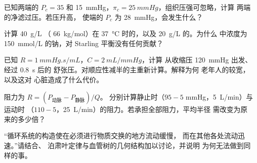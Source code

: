 \begin{exercise}[$\star\star$]\label{exo:b2:blood-circulation:8}
已知两端的 $P_c = 35$ 和 \qty{15}{mmHg}，$\pi_c =
\qty{25}{mmHg}$，组织压强可忽略，计算
两端的净滤过压。若压升高，
使端的 $P_c$ 为 \qty{28}{mmHg}，会发生什么？
\end{exercise}

\begin{exercise}[$\star\star$]\label{exo:b2:blood-circulation:9}
计算 \qty{40}{g/L} （
\qty{66}{kg/mol}）在 \qty{37}{\celsius} 时的，以及 \qty{20}{g/L} 的。为什么
中浓度为 \qty{150}{mmol/L} 的钠，对
Starling 平衡没有任何贡献？
\end{exercise}

\begin{exercise}[$\star\star\star$]\label{exo:b2:blood-circulation:10}
已知 $R = \qty{1}{mmHg.s/mL}$，$C = \qty{2}{mL/mmHg}$，计算
从收缩压 \qty{120}{mmHg} 出发、经过 \qty{0.8}{s} 后的
舒张压。对顺应性减半的主重新计算。解释为何
老年人的较宽，以及这对
心脏造成了什么代价。
\end{exercise}

\begin{exercise}[$\star\star\star$]\label{exo:b2:blood-circulation:11}
阻力为 $R = (P_{\text{动脉}} - P_{\text{静脉}})/Q$。
分别计算静止时（$95 - 5$ mmHg，\qty{5}{L/min}）与运动时
（$110 - 5$，\qty{25}{L/min}）的阻力。若承担全部阻力，平均半径
需改变为原来的多少倍？
\end{exercise}

\begin{exercise}[$\star\star\star$]\label{exo:b2:blood-circulation:12}
“循环系统的构造使在必须进行物质交换的地方流动缓慢，
而在其他各处流动迅速。”请结合、
泊肃叶定律与血管树的几何结构加以讨论，并说明
为何无法做到同样的事。
\end{exercise}

